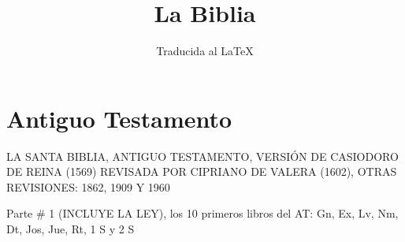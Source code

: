\documentclass[oneside, twocolumn,  12pt]{book}
\begin{document}
	
	\frontmatter
	\title{La Biblia}
	\author{Traducida al LaTeX}
	\date{}
	\maketitle
	
	\tableofcontents
	
	\mainmatter
	
	\part{Antiguo Testamento}
	\onecolumn
	
	LA SANTA BIBLIA, ANTIGUO TESTAMENTO, VERSIÓN DE CASIODORO DE REINA (1569)
	REVISADA POR CIPRIANO DE VALERA (1602), OTRAS REVISIONES: 1862, 1909 Y 1960
	
	Parte \# 1 (INCLUYE LA LEY), los 10 primeros libros del AT: Gn, Ex, Lv, Nm, Dt, Jos, Jue, Rt, 1 S y 2 S
	\twocolumn
	
	
	
	
	
	
\end{document}
